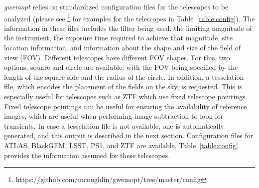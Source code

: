 \documentclass[twocolumn]{aastex62}
\begin{document}
\emph{gwemopt} relies on standardized configuration files for the telescopes to be analyzed (please see \footnote{https://github.com/mcoughlin/gwemopt/tree/master/config} for examples for the telescopes in Table~\ref{table:config}). 
The information in these files includes the filter being used, the limiting magnitude of the instrument, the exposure time required to achieve that magnitude, site location information, and information about the shape and size of the field of view (FOV). 
Different telescopes have different FOV shapes.
For this, two options, square and circle are available, with the FOV being specified by the length of the square side and the radius of the circle. In addition, a tesselation file, which encodes the placement of the fields on the sky, is requested. This is especially useful for telescopes such as ZTF which use fixed telescope pointings. Fixed telescope pointings can be useful for ensuring the availability of reference images, which are useful when performing image subtraction to look for transients. In case a tesselation file is not available, one is automatically generated, and this output is described in the next section.
Configuration files for ATLAS, BlackGEM, LSST, PS1, and ZTF are available.
Table~\ref{table:config} provides the information assumed for these telescopes.\\
\end{document}
